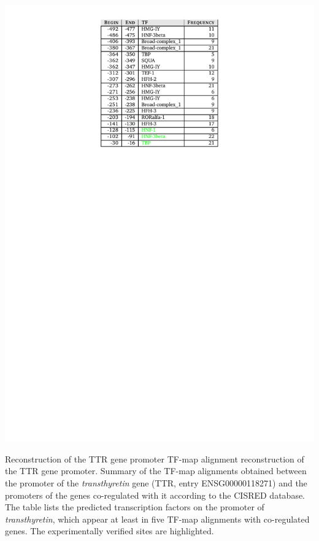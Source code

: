 \begin{table}[t!]
\begin{center}
\begin{minipage}{0.98\linewidth}\setlength{\parindent}{0pt}
\begin{center}
\includegraphics[bb=181 566 414 817,clip]{tables/ttr}
\end{center}
\end{minipage}
          {Reconstruction of the TTR gene promoter}%
          {TF-map alignment reconstruction of the TTR gene promoter.}%
          {Summary of the TF-map alignments obtained between the
promoter of the \emph{transthyretin} gene (TTR, \ensembl{} entry ENSG00000118271)
and the promoters of the genes co-regulated with it according to the CISRED 
database. The table lists the predicted transcription factors on the promoter 
of \emph{transthyretin}, which appear at least in five TF-map alignments with
co-regulated genes. The experimentally verified sites are highlighted.}
\end{center}
\end{table}

